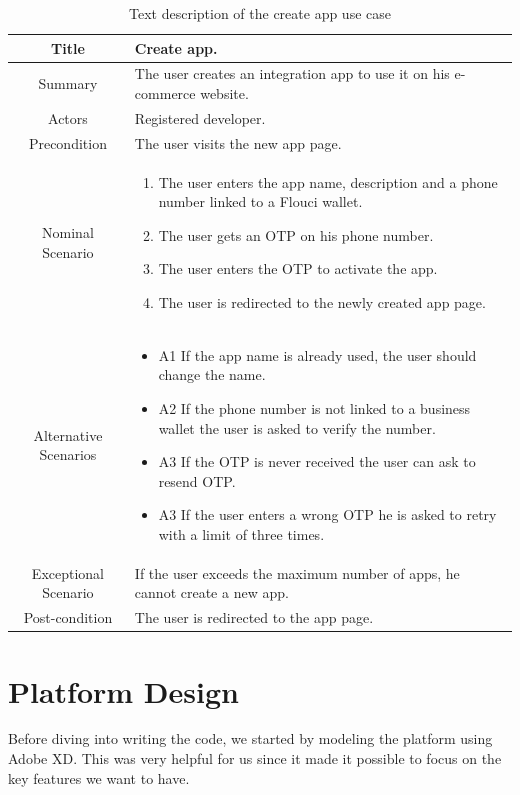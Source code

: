 \begin{spacing}{1.2}
\begin{table}[H]
\centering
\caption{Text description of the create app use case}
\begin{tabularx}{\linewidth}{|c|X|}
\hline
Title & Create app.  \\ \hline
Summary & The user creates an integration app to use it on his e-commerce website. \\ \hline
Actors & Registered developer. \\ \hline
Precondition & The user visits the new app page. \\ \hline
Nominal Scenario & \begin{enumerate}
 \item The user enters the app name, description and a phone number linked to a Flouci wallet. 
 \item The user gets an OTP on his phone number.
 \item The user enters the OTP to activate the app.
 \item The user is redirected to the newly created app page.
 \end{enumerate}
 \\ \hline
Alternative Scenarios & \begin{itemize}
	\item A1 If the app name is already used, the user should change the name.
	\item A2 If the phone number is not linked to a business wallet the user is asked to verify the number.
	\item A3 If the OTP is never received the user can ask to resend OTP.
	\item A3 If the user enters a wrong OTP he is asked to retry with a limit of three times.
\end{itemize} \\ \hline
Exceptional Scenario & If the user exceeds the maximum number of apps, he cannot create a new app. \\ \hline
Post-condition & The user is redirected to the app page. \\ \hline
\end{tabularx}
\label{apptable}
\end{table}

\section{Platform Design}
Before diving into writing the code, we started by modeling the platform using Adobe XD. This was very helpful for us since it made it possible to focus on the key features we want to have.


\end{spacing}
